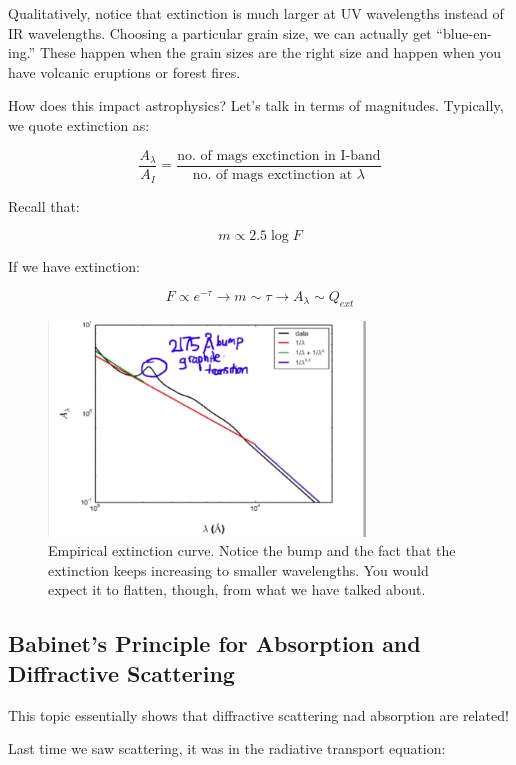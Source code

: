 \documentclass{article}
\begin{document}
Qualitatively, notice that extinction is much larger at UV wavelengths instead of IR wavelengths. Choosing a particular grain size, we can actually get ``blue-en-ing.'' These happen when the grain sizes are the right size and happen when you have volcanic eruptions or forest fires.

How does this impact astrophysics? Let's talk in terms of magnitudes. Typically, we quote extinction as:

$$
\frac{A_\lambda}{A_I} = \frac{\text{no. of mags exctinction in I-band}}{\text{no. of mags exctinction at } \lambda}
$$

Recall that:

$$
m \propto 2.5 \log F
$$

If we have extinction:

$$
F \propto e^{-\tau} \rightarrow m \sim \tau \rightarrow A_\lambda \sim Q_{ext}
$$

\begin{figure}
    \centering
    \includegraphics[width=0.75\textwidth]{figures/Screen Shot 2020-11-14 at 4.35.57 PM.png}
    \caption{Empirical extinction curve. Notice the bump and the fact that the extinction keeps increasing to smaller wavelengths. You would expect it to flatten, though, from what we have talked about.}
    \label{fig:empiral_ext}
\end{figure}

\subsection{Babinet's Principle for Absorption and Diffractive Scattering}

This topic essentially shows that diffractive scattering nad absorption are related!

Last time we saw scattering, it was in the radiative transport equation:
\end{document}
